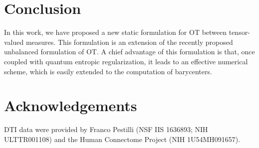 
\section{Conclusion}

In this work, we have proposed a new static formulation for OT between tensor-valued measures. This formulation is an extension of the recently proposed unbalanced formulation of OT. A chief advantage of this formulation is that, once coupled with quantum entropic regularization, it leads to an effective numerical scheme, which is easily extended to the computation of barycenters. 


\section*{Acknowledgements}

%
DTI data were provided by Franco Pestilli (NSF IIS 1636893; NIH ULTTR001108) and the Human Connectome Project (NIH 1U54MH091657). 

